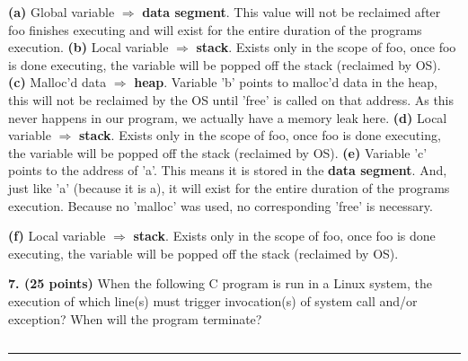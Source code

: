 \documentclass[12pt]{jhwhw}
\begin{document}
	\begin{addmargin}[1em]{}
		\textbf{(a)} Global variable $\Rightarrow$ \textbf{data segment}. This value
			will not be reclaimed after foo finishes executing and will exist
			for the entire duration of the programs execution.
		\bigbreak
		\textbf{(b)} Local variable $\Rightarrow$ \textbf{stack}. Exists only in the scope of
			foo, once foo is done executing, the variable will be popped off the stack
			(reclaimed by OS).
		\bigbreak
		\textbf{(c)} Malloc'd data $\Rightarrow$ \textbf{heap}. Variable 'b' points to malloc'd
			data in the heap, this will not be reclaimed by the OS until 'free' is 
			called on that address. As this never happens in our program, we actually
			have a memory leak here.
		\bigbreak
		\textbf{(d)} Local variable $\Rightarrow$ \textbf{stack}. Exists only in the scope of
			foo, once foo is done executing, the variable will be popped off the stack
			(reclaimed by OS).
		\bigbreak
		\textbf{(e)} Variable 'c' points to the address of 'a'. This means it is 
			stored in the \textbf{data segment}. And, just like 'a' (because it is a),
			it will exist for the entire duration of the programs execution. Because no
			'malloc' was used, no corresponding 'free' is necessary.

		\bigbreak
		\textbf{(f)} Local variable $\Rightarrow$ \textbf{stack}. Exists only in the scope of
			foo, once foo is done executing, the variable will be popped off the stack
			(reclaimed by OS).
	\end{addmargin}

\bigbreak
\textbf{7. (25 points)} When the following C program is run in a Linux system,
the execution of which line(s) must trigger invocation(s) of system call and/or exception?
When will the program terminate?
\inputminted{c}{p7.c}
\textcolor[RGB]{240,240,240}{\rule{\textwidth}{0.5pt}}\bigbreak

	\begin{addmargin}[1em]{}
	\end{addmargin}
\end{document}
